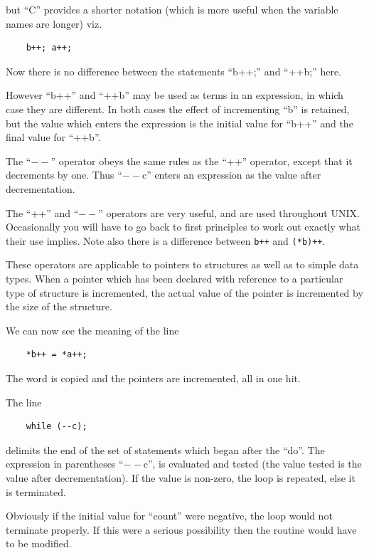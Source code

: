 \noindent but ``C'' provides a shorter notation
(which is more useful when the variable
names are longer) viz.

\begin{verbatim}
    b++; a++;
\end{verbatim}

Now there is no difference between the
statements ``b++;'' and ``++b;'' here.

However ``b++'' and ``++b'' may be used as
terms in an expression, in which case
they are different. In both cases the
effect of incrementing ``b'' is retained,
but the value which enters the expression is
the initial value for ``b++'' and
the final value for ``++b''.

The ``$--$'' operator obeys the same rules
as the ``++'' operator, except that it
decrements by one. Thus ``$--$c'' enters an
expression as the value after decrementation.

The ``++'' and ``$--$'' operators are very
useful, and are used throughout UNIX.
Occasionally you will have to go back
to first principles to work out exactly
what their use implies. Note also
there is a difference between {\tt *b++} and {\tt (*b)++}.

These operators are applicable to
pointers to structures as well as to
simple data types. When a pointer
which has been declared with reference
to a particular type of structure is
incremented, the actual value of the
pointer is incremented by the size of
the structure.

\noindent We can now see the meaning of the line

\begin{verbatim}
    *b++ = *a++;
\end{verbatim}

\noindent The word is copied and the pointers are
incremented, all in one hit.

\noindent The line

\begin{verbatim}
    while (--c);
\end{verbatim}

\noindent delimits the end of the set of statements
which began after the ``do''. The
expression in parentheses ``$--$c'', is
evaluated and tested (the value tested
is the value after decrementation). If
the value is non-zero, the loop is
repeated, else it is terminated.

Obviously if the initial value for
``count'' were negative, the loop would
not terminate properly. If this were a
serious possibility then the routine
would have to be modified.

